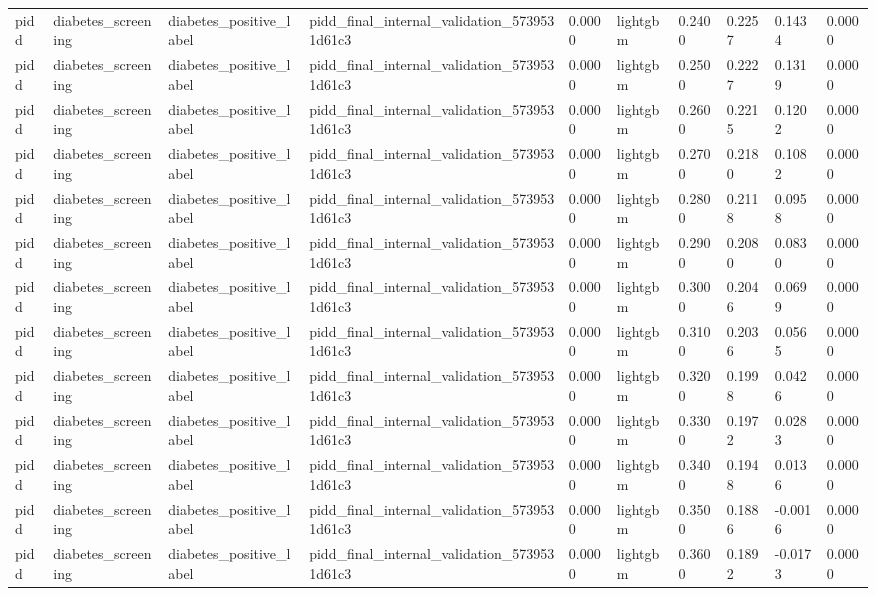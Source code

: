 \begin{tabular}{llllllllll}
pidd & diabetes\_screening & diabetes\_positive\_label & pidd\_final\_internal\_validation\_5739531d61c3 & 0.0000 & lightgbm & 0.2400 & 0.2257 & 0.1434 & 0.0000 \\
pidd & diabetes\_screening & diabetes\_positive\_label & pidd\_final\_internal\_validation\_5739531d61c3 & 0.0000 & lightgbm & 0.2500 & 0.2227 & 0.1319 & 0.0000 \\
pidd & diabetes\_screening & diabetes\_positive\_label & pidd\_final\_internal\_validation\_5739531d61c3 & 0.0000 & lightgbm & 0.2600 & 0.2215 & 0.1202 & 0.0000 \\
pidd & diabetes\_screening & diabetes\_positive\_label & pidd\_final\_internal\_validation\_5739531d61c3 & 0.0000 & lightgbm & 0.2700 & 0.2180 & 0.1082 & 0.0000 \\
pidd & diabetes\_screening & diabetes\_positive\_label & pidd\_final\_internal\_validation\_5739531d61c3 & 0.0000 & lightgbm & 0.2800 & 0.2118 & 0.0958 & 0.0000 \\
pidd & diabetes\_screening & diabetes\_positive\_label & pidd\_final\_internal\_validation\_5739531d61c3 & 0.0000 & lightgbm & 0.2900 & 0.2080 & 0.0830 & 0.0000 \\
pidd & diabetes\_screening & diabetes\_positive\_label & pidd\_final\_internal\_validation\_5739531d61c3 & 0.0000 & lightgbm & 0.3000 & 0.2046 & 0.0699 & 0.0000 \\
pidd & diabetes\_screening & diabetes\_positive\_label & pidd\_final\_internal\_validation\_5739531d61c3 & 0.0000 & lightgbm & 0.3100 & 0.2036 & 0.0565 & 0.0000 \\
pidd & diabetes\_screening & diabetes\_positive\_label & pidd\_final\_internal\_validation\_5739531d61c3 & 0.0000 & lightgbm & 0.3200 & 0.1998 & 0.0426 & 0.0000 \\
pidd & diabetes\_screening & diabetes\_positive\_label & pidd\_final\_internal\_validation\_5739531d61c3 & 0.0000 & lightgbm & 0.3300 & 0.1972 & 0.0283 & 0.0000 \\
pidd & diabetes\_screening & diabetes\_positive\_label & pidd\_final\_internal\_validation\_5739531d61c3 & 0.0000 & lightgbm & 0.3400 & 0.1948 & 0.0136 & 0.0000 \\
pidd & diabetes\_screening & diabetes\_positive\_label & pidd\_final\_internal\_validation\_5739531d61c3 & 0.0000 & lightgbm & 0.3500 & 0.1886 & -0.0016 & 0.0000 \\
pidd & diabetes\_screening & diabetes\_positive\_label & pidd\_final\_internal\_validation\_5739531d61c3 & 0.0000 & lightgbm & 0.3600 & 0.1892 & -0.0173 & 0.0000 \\

\end{tabular}
